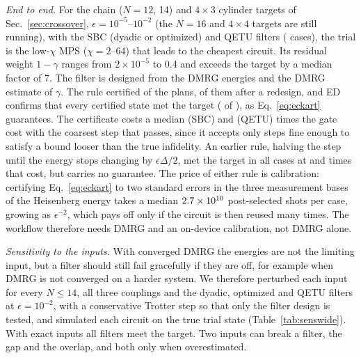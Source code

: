 \documentclass[aps,pra,twocolumn,superscriptaddress,nofootinbib]{revtex4-2}
\begin{document}
\emph{End to end.} For the chain ($N=12$, 14) and $4\times3$ cylinder targets of
Sec.~\ref{sec:crossover}, $\epsilon=10^{-5}$--$10^{-2}$ (the $N=16$ and $4\times4$ targets are still running), with the SBC (dyadic or optimized) and QETU filters (\ekN{}
cases), the trial is the low-$\chi$ MPS ($\chi=2$--64) that leads to the cheapest circuit. Its residual weight
$1-\gamma$ ranges from $2\times10^{-5}$ to 0.4 and exceeds the target by a median factor of 7. The filter is designed
from the DMRG energies and the DMRG estimate of $\gamma$. The rule certified \ekCert{} of the \ekN{} plans,
\ekRedesign{} of them after a redesign, and ED confirms that every certified state met the target (\ekOK{} of
\ekCert), as Eq.~\eqref{eq:eckart} guarantees. The certificate costs a median \ekRatioS{} (SBC) and \ekRatioQ{} (QETU)
times the gate cost with the coarsest step that passes, since it accepts only steps fine enough to satisfy a bound
looser than the true infidelity. An earlier rule, halving the step until the energy stops changing by
$\epsilon\Delta/2$, met the target in all \apEtot{} cases at \apEorS{} and \apEorQ{} times that cost, but carries no
guarantee. The price of either rule is calibration: certifying Eq.~\eqref{eq:eckart} to two standard errors in the
three measurement bases of the Heisenberg energy takes a median $2.7\times10^{10}$ post-selected shots per case, growing as
$\epsilon^{-2}$, which pays off only if the circuit is then reused many times. The workflow therefore needs DMRG and an
on-device calibration, not DMRG alone.

\emph{Sensitivity to the inputs.} With converged DMRG the energies are not the limiting input, but a filter should
still fail gracefully if they are off, for example when DMRG is not converged on a harder system. We therefore perturbed
each input for every $N\le14$, all three couplings and the dyadic, optimized and QETU filters at $\epsilon=10^{-2}$,
with a conservative Trotter step so that only the filter design is tested, and simulated each circuit on the true
trial state (Table~\ref{tab:senswide}). With exact inputs all \sensGapN{} filters meet the target. Two inputs can
break a filter, the gap and the overlap, and both only when overestimated.
\end{document}
